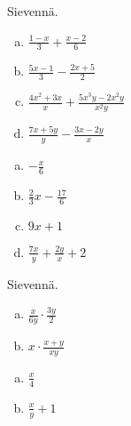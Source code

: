 \begin{tehtava}
Sievennä.
	\begin{enumerate}[a)]
	\item $ \frac{1-x}{3} + \frac{x-2}{6}$
	\item $ \frac{5x-1}{3} - \frac{2x+5}{2}$
	\item $\frac{4x^2+3x}{x} + \frac{5x^3y-2x^2y}{x^2y}$
	\item $\frac{7x+5y}{y} - \frac{3x-2y}{x}$
	\end{enumerate}

\begin{vastaus}
	\begin{enumerate}[a)]
	\item $ -\frac{x}{6}$
	\item $ \frac{2}{3} x - \frac{17}{6}$
	\item $9x+1$
	\item $\frac{7x}{y} + \frac{2y}{x} +2$
	\end{enumerate}
\end{vastaus}
\end{tehtava}

\begin{tehtava}
Sievennä.
	\begin{enumerate}[a)]
	\item $\frac{x}{6y} \cdot \frac{3y}{2}$
	\item $x \cdot \frac{x+y}{xy}$
	\end{enumerate}

\begin{vastaus}
	\begin{enumerate}[a)]
	\item $\frac{x}{4}$
	\item $\frac{x}{y} + 1$
	\end{enumerate}
\end{vastaus}
\end{tehtava}
